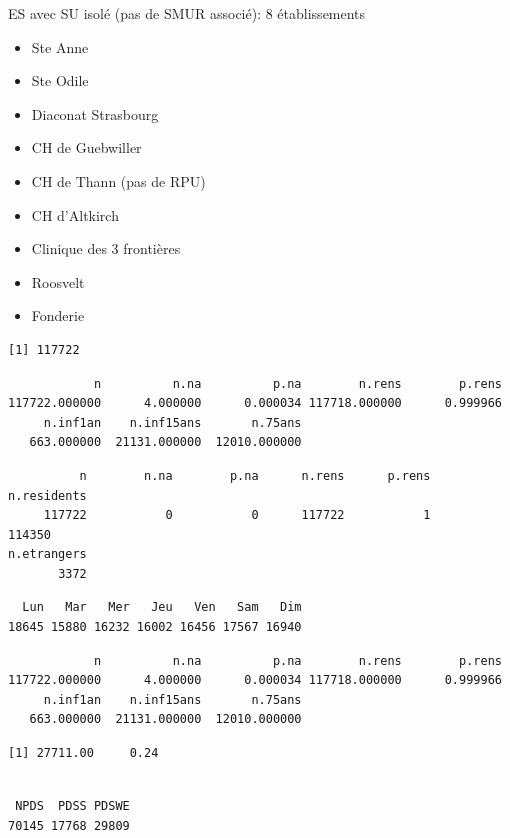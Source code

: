 \documentclass[]{article}
\begin{document}
ES avec SU isolé (pas de SMUR associé): 8 établissements

\begin{itemize}
\itemsep1pt\parskip0pt
\item
  Ste Anne
\item
  Ste Odile
\item
  Diaconat Strasbourg
\item
  CH de Guebwiller
\item
  CH de Thann (pas de RPU)
\item
  CH d'Altkirch
\item
  Clinique des 3 frontières
\item
  Roosvelt
\item
  Fonderie
\end{itemize}

\begin{verbatim}
[1] 117722
\end{verbatim}

\begin{verbatim}
            n          n.na          p.na        n.rens        p.rens 
117722.000000      4.000000      0.000034 117718.000000      0.999966 
     n.inf1an    n.inf15ans       n.75ans 
   663.000000  21131.000000  12010.000000 
\end{verbatim}

\begin{verbatim}
          n        n.na        p.na      n.rens      p.rens n.residents 
     117722           0           0      117722           1      114350 
n.etrangers 
       3372 
\end{verbatim}

\begin{verbatim}
  Lun   Mar   Mer   Jeu   Ven   Sam   Dim 
18645 15880 16232 16002 16456 17567 16940 
\end{verbatim}

\begin{verbatim}
            n          n.na          p.na        n.rens        p.rens 
117722.000000      4.000000      0.000034 117718.000000      0.999966 
     n.inf1an    n.inf15ans       n.75ans 
   663.000000  21131.000000  12010.000000 
\end{verbatim}

\begin{verbatim}
[1] 27711.00     0.24
\end{verbatim}

\begin{verbatim}

 NPDS  PDSS PDSWE 
70145 17768 29809 
\end{verbatim}
\end{document}
